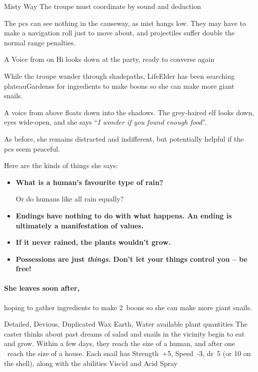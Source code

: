\begin{multicols}{2}
{Misty Way}%
{The troupe must coordinate by sound and deduction}%

The \glspl{pc} can see nothing in the causeway, as mist hangs low.
They may have to make a navigation roll just to move about, and projectiles suffer double the normal range penalties.

{A Voice from on Hi}%
{ looks down at the party, ready to converse again}%

While the troupe wander through \gls{shadepaths}, \gls{LifeElder} has been searching \glspl{plateauGardens} for \glspl{ingredient} to make \glspl{boon} so she can make more giant snails.

\begin{boxtext}
  A voice from above floats down into the shadows.
  The grey-haired elf looks down, eyes wide-open, and she says ``\textit{I wonder if you found enough food}''.
\end{boxtext}

As before, she remains distracted and indifferent, but potentially helpful if the \glspl{pc} seem peaceful.

Here are the kinds of things she says:

\begin{itemize}
  \item[\adforn{54}]\bf
  What is a human's favourite type of rain?

  Or do humans like all rain equally?
  \item[\adforn{54}]\bf
  Endings have nothing to do with what happens.
  An ending is ultimately a manifestation of values.
  \item[\adforn{54}]\bf
  If it never rained, the plants wouldn't grow.
  \item[\adforn{54}]\bf
  Possessions are just \emph{things}.
  Don't let your things control you -- be free!
\end{itemize}

\paragraph{She leaves soon after,}
hoping to gather \glspl{ingredient} to make 2~\glspl{boon} so she can make more giant snails.

  {Detailed, Devious, Duplicated}%
  {Wax}%
  {Earth, Water}%
  {available plant quantities}%
  {The caster thinks about past dreams of salad and  snails in the vicinity begin to eat and grow.
  Within a few days, they reach the size of a human, and after one \showOnset\ reach the size of a house.
  Each snail has Strength~+5, Speed~-3, \gls{dr}~5 (or 10 on the shell), along with the abilities Viscid and Acid Spray}%
  {}



\end{multicols}
